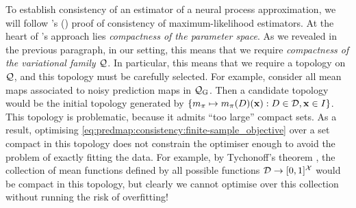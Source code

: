 \documentclass[12pt, twoside]{report}
\begin{document}
To establish consistency of an estimator of a neural process approximation, we will follow \citeauthor{Wald:1949:Note_on_the_Consistency_of}'s (\citeyear{Wald:1949:Note_on_the_Consistency_of}) proof of consistency of maximum-likelihood estimators.
At the heart of \citeauthor{Wald:1949:Note_on_the_Consistency_of}'s approach lies \emph{compactness of the parameter space}.
As we revealed in the previous paragraph, in our setting, this means that we require \emph{compactness of the variational family $\mathcal{Q}$}.
In particular, this means that we require a topology on $\mathcal{Q}$, and this topology must be carefully selected.
For example, consider all mean maps associated to noisy prediction maps in $\Qc\ss{G}$.
Then a candidate topology would be the initial topology generated by $\{m_\pi \mapsto m_\pi(D)(\mathbf{x}) : D \in \mathcal{D}, \mathbf{x} \in I\}$.
This topology is problematic, because it admits ``too large'' compact sets.
As a result, optimising \eqref{eq:predmap:consistency:finite-sample_objective} over a set compact in this topology does not constrain the optimiser enough to avoid the problem of exactly fitting the data.
For example, by Tychonoff's theorem \parencite[Theorem 37.3;][]{Munkres:2000:Topology}, the collection of mean functions defined by all possible functions $\mathcal{D} \to [0, 1]^{\mathcal{X}}$ would be compact in this topology, but clearly we cannot optimise over this collection without running the risk of overfitting!


\end{document}

